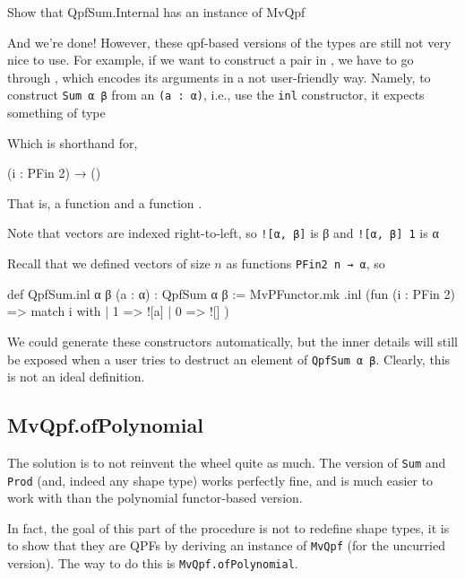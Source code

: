 \documentclass[titlepage]{report}
\newenvironment{remark}{%
\begin{framed}
\begin{trivlist}
    \item[\hskip \labelsep {\bfseries Remark:}]}%
{%
\end{trivlist}%
\end{framed}
}
\newenvironment{todo}{%
\definecolor{shadecolor}{HTML}{F8E0E0}%
\begin{shaded}%
\begin{trivlist}                         
    \item[\hskip \labelsep {\bfseries Todo:}]}{\end{trivlist}\end{shaded}}
\begin{document}
\begin{todo}
    Show that QpfSum.Internal has an instance of MvQpf
\end{todo}

And we're done! However, these qpf-based versions of the types are still not very nice to use.
For example, if we want to construct a pair in , we have to go through ,
which encodes its arguments in a not user-friendly way. 
Namely, to construct \texttt{Sum α β} from an \texttt{(a : α)}, i.e., use the \texttt{inl} constructor, 
it expects something of type
\begin{center}
\end{center}
Which is shorthand for, 
\begin{center}
    (i : PFin 2) → ()
\end{center}
That is, a function  and a function .
\begin{remark}
    Note that vectors are indexed right-to-left, so \texttt{![α, β]} is β
    and \texttt{![α, β] 1} is α
\end{remark}

Recall that we defined vectors of size $n$ as functions \texttt{PFin2 n → α}, so 


\begin{leancode}
    def QpfSum.inl {α β} (a : α) : QpfSum α β :=
      MvPFunctor.mk .inl (fun (i : PFin 2) => match i with
        | 1 => ![a]
        | 0 => ![]
      )
\end{leancode}


We could generate these constructors automatically, but the inner details will still be exposed
when a user tries to destruct an element of \texttt{QpfSum α β}.
Clearly, this is not an ideal definition.

\subsection{MvQpf.ofPolynomial}
The solution is to not reinvent the wheel quite as much.
The  version of \texttt{Sum} and \texttt{Prod} (and, indeed any shape type) works
perfectly fine, and is much easier to work with than the polynomial functor-based version.

In fact, the goal of this part of the procedure is not to redefine shape types, it is to show that
they are QPFs by deriving an instance of \texttt{MvQpf} (for the uncurried version).
The way to do this is \texttt{MvQpf.ofPolynomial}.
\end{document}
